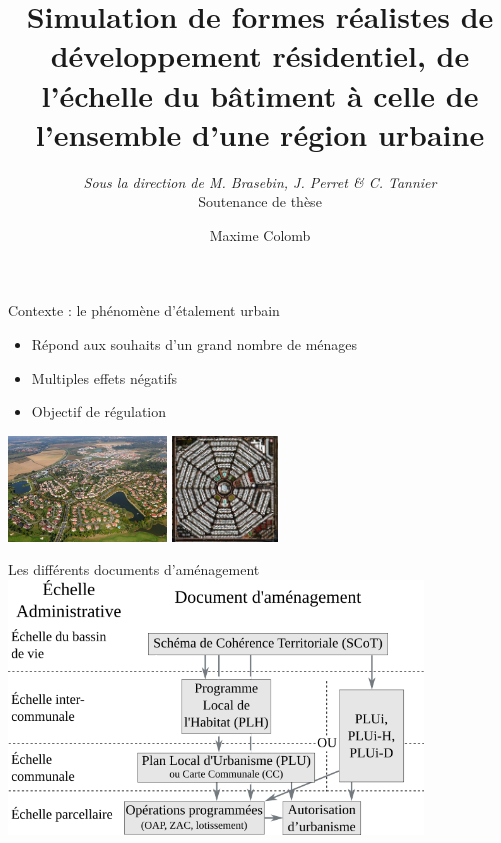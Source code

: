 \documentclass[xcolor=table]{beamer}
\title{Simulation de formes réalistes de développement résidentiel, de l'échelle du bâtiment à celle de l'ensemble d'une région urbaine}
\author{Maxime Colomb}
\subtitle{\textit{Sous la direction de M. Brasebin, J. Perret \& C. Tannier}
	\\Soutenance de thèse}
\begin{document}
\maketitle

\begin{frame}{Contexte : le phénomène d'étalement urbain}
\begin{itemize}
	\item Répond aux souhaits d'un grand nombre de ménages
	\item Multiples effets négatifs
	\item Objectif de régulation
\end{itemize}
\includegraphics[height=2.8cm]{Images/consome.jpg}
\includegraphics[height=2.8cm]{Images/sto.jpeg}
\end{frame}

\begin{frame}{Les différents documents d'aménagement} 
\includegraphics[width=11cm]{Images/planification-globale-Prez.png}
\end{frame}
\end{document}
